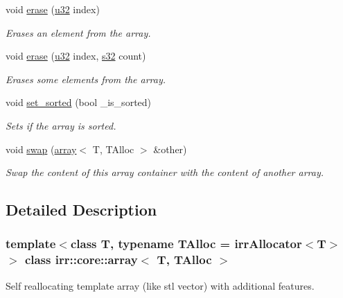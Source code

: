 \begin{DoxyCompactItemize}
void \hyperlink{classirr_1_1core_1_1array_a5ba14e37dddaecd9c3e813a78c157dc8}{erase} (\hyperlink{namespaceirr_a0416a53257075833e7002efd0a18e804}{u32} index)
\begin{DoxyCompactList}\small\item\em Erases an element from the array. \end{DoxyCompactList}\item 
void \hyperlink{classirr_1_1core_1_1array_ab9bb8cb0e6ebc4839fa2f7bc8e626800}{erase} (\hyperlink{namespaceirr_a0416a53257075833e7002efd0a18e804}{u32} index, \hyperlink{namespaceirr_ac66849b7a6ed16e30ebede579f9b47c6}{s32} count)
\begin{DoxyCompactList}\small\item\em Erases some elements from the array. \end{DoxyCompactList}\item 
\mbox{\label{classirr_1_1core_1_1array_ab73d5838db931996f66f9efcc7127b49}} 
void \hyperlink{classirr_1_1core_1_1array_ab73d5838db931996f66f9efcc7127b49}{set\+\_\+sorted} (bool \+\_\+is\+\_\+sorted)
\begin{DoxyCompactList}\small\item\em Sets if the array is sorted. \end{DoxyCompactList}\item 
void \hyperlink{classirr_1_1core_1_1array_a8857046f500a2990fc9930b204a3dbad}{swap} (\hyperlink{classirr_1_1core_1_1array}{array}$<$ T, T\+Alloc $>$ \&other)
\begin{DoxyCompactList}\small\item\em Swap the content of this array container with the content of another array. \end{DoxyCompactList}\end{DoxyCompactItemize}


\subsection{Detailed Description}
\subsubsection*{template$<$class T, typename T\+Alloc = irr\+Allocator$<$\+T$>$$>$\newline
class irr\+::core\+::array$<$ T, T\+Alloc $>$}

Self reallocating template array (like stl vector) with additional features. 


